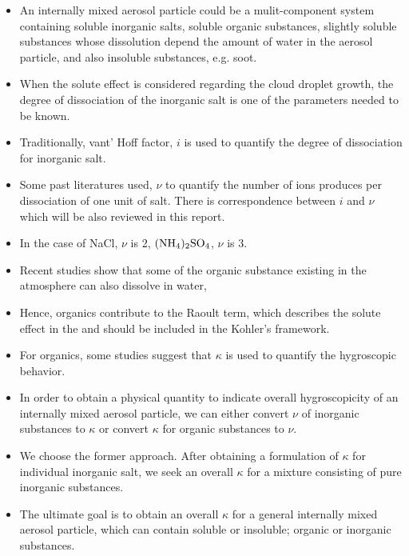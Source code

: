 \documentclass[12pt]{article}
\begin{document}
\begin{itemize}

\item An internally mixed aerosol particle could be a mulit-component system containing soluble inorganic salts, soluble organic substances, slightly soluble substances whose dissolution depend the amount of water in the aerosol particle, and also insoluble substances, e.g. soot.

\item When the solute effect is considered regarding the cloud droplet growth, the degree of dissociation of the inorganic salt is one of the parameters needed to be known. 

\item Traditionally, vant' Hoff factor, $i$ is used to quantify the degree of dissociation for inorganic salt. 

\item Some past literatures used, $\nu$ to quantify the number of ions produces per dissociation of one unit of salt. There is correspondence between $i$ and $\nu$ which will be also reviewed in this report.

\item  In the case of NaCl, $\nu$ is 2, $\rm (NH_4)_2SO_4$, $\nu$ is 3.

\item Recent studies show that some of the organic substance existing in the atmosphere can also dissolve in water,

\item Hence, organics contribute to the Raoult term, which describes the solute effect in the and should be included in the Kohler's  framework. 

\item For organics, some studies suggest that $\kappa$ is used to quantify the hygroscopic behavior. 


\item In order to obtain a physical quantity to indicate overall hygroscopicity of an internally mixed aerosol particle, we can either convert $\nu$ of inorganic substances to $\kappa$ or convert $\kappa$ for organic substances to $\nu$. 


\item We choose the former approach. After obtaining a formulation of $\kappa$ for individual inorganic salt, we seek an overall $\kappa$ for a mixture consisting of pure inorganic substances. 

\item The ultimate goal is to obtain an overall $\kappa$ for a general internally mixed aerosol particle, which can contain soluble or insoluble; organic or inorganic substances.


\end{itemize}
\end{document}
